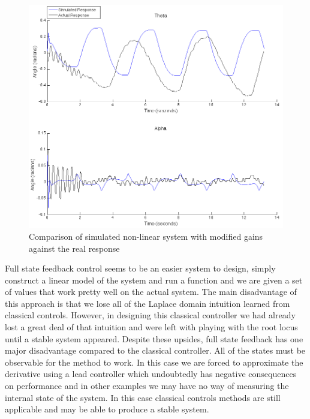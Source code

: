 \documentclass{article}
\theoremstyle{plain}
\theoremstyle{definition}
\theoremstyle{remark}
\begin{document}
\begin{figure}
\begin{center}
\includegraphics[width = 16cm]{modifiedrealvsSimulation.png}
\end{center}
\caption{Comparison of simulated non-linear system with modified gains against the real response}
\label{classicalSimulinkvsReal}
\end{figure}

Full state feedback control seems to be an easier system to design, simply construct a linear model of the system and run a function and we are given a set of values that work pretty well on the actual system.  The main disadvantage of this approach is that we lose all of the Laplace domain intuition learned from classical controls. However, in designing this classical controller we had already lost a great deal of that intuition and were left with playing with the root locus until a stable system appeared.  Despite these upsides, full state feedback has one major disadvantage compared to the classical controller.  All of the states must be observable for the method to work.  In this case we are forced to approximate the derivative using a lead controller which undoubtedly has negative consequences on performance and in other examples we may have no way of measuring the internal state of the system.  In this case classical controls methods are still applicable and may be able to produce a stable system. 
\end{document}

